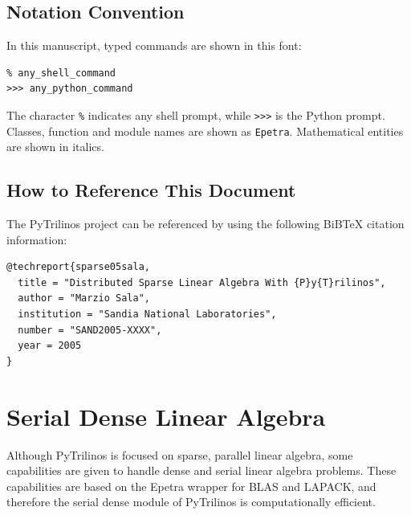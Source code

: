 \documentclass[10pt,relax]{SANDreport}
\begin{document}
\subsection{Notation Convention}

In this manuscript, typed commands are shown in this font:
\begin{verbatim}
% any_shell_command
>>> any_python_command
\end{verbatim}
The character \verb!%! indicates any shell prompt, while \verb!>>>! is the
Python prompt. Classes, function and module names are shown as \verb!Epetra!.
Mathematical entities are shown in italics.

\subsection{How to Reference This Document}
\label{sec:reference}

The PyTrilinos project can be referenced by using the following BiBTeX
citation information: 
\begin{verbatim}
@techreport{sparse05sala,
  title = "Distributed Sparse Linear Algebra With {P}y{T}rilinos",
  author = "Marzio Sala",
  institution = "Sandia National Laboratories",
  number = "SAND2005-XXXX",
  year = 2005
}
\end{verbatim}

\section{Serial Dense Linear Algebra}
\label{sec:serialdense}

Although PyTrilinos is focused on sparse, parallel linear algebra, some
capabilities are given to handle dense and serial linear algebra problems.
These capabilities are based on the Epetra wrapper for BLAS and LAPACK, and
therefore the serial dense module of PyTrilinos is computationally efficient.
\end{document}
